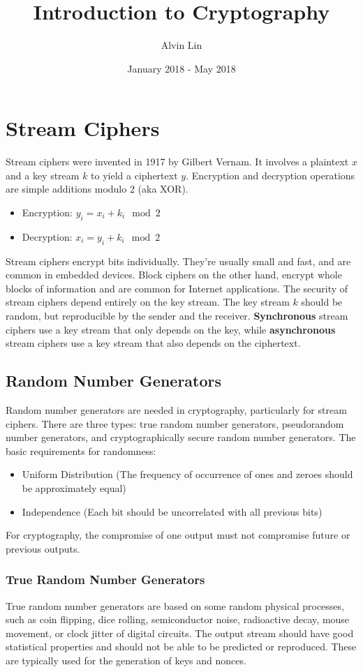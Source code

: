 \documentclass{math}
\title{Introduction to Cryptography}
\author{Alvin Lin}
\date{January 2018 - May 2018}
\begin{document}
\maketitle

\section*{Stream Ciphers}
Stream ciphers were invented in 1917 by Gilbert Vernam. It involves a plaintext
\( x \) and a key stream \( k \) to yield a ciphertext \( y \). Encryption
and decryption operations are simple additions modulo 2 (aka XOR).
\begin{itemize}
  \item Encryption: \( y_i = x_i+k_i\mod2 \)
  \item Decryption: \( x_i = y_i+k_i\mod2 \)
\end{itemize}
Stream ciphers encrypt bits individually. They're usually small and fast, and
are common in embedded devices. Block ciphers on the other hand, encrypt whole
blocks of information and are common for Internet applications. The security of
stream ciphers depend entirely on the key stream. The key stream \( k \) should
be random, but reproducible by the sender and the receiver. \textbf{Synchronous}
stream ciphers use a key stream that only depends on the key, while
\textbf{asynchronous} stream ciphers use a key stream that also depends on the
ciphertext.

\subsection*{Random Number Generators}
Random number generators are needed in cryptography, particularly for stream
ciphers. There are three types: true random number generators, pseudorandom
number generators, and cryptographically secure random number generators. The
basic requirements for randomness:
\begin{itemize}
  \item Uniform Distribution (The frequency of occurrence of ones and zeroes
  should be approximately equal)
  \item Independence (Each bit should be uncorrelated with all previous bits)
\end{itemize}
For cryptography, the compromise of one output must not compromise future or
previous outputs.

\subsubsection*{True Random Number Generators}
True random number generators are based on some random physical processes, such
as coin flipping, dice rolling, semiconductor noise, radioactive decay, mouse
movement, or clock jitter of digital circuits. The output stream should have
good statistical properties and should not be able to be predicted or
reproduced. These are typically used for the generation of keys and nonces.
\end{document}
